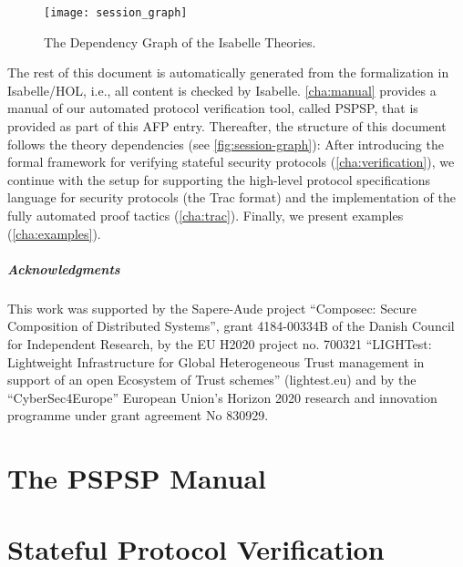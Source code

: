 \documentclass[10pt,DIV16,a4paper,abstract=true,twoside=semi,openright]
{scrreprt}
\begin{document}
  \begin{figure}
    \centering
    \texttt{[image: session\_graph]}
    \caption{The Dependency Graph of the Isabelle Theories.\label{fig:session-graph}}
  \end{figure}
  The rest of this document is automatically generated from the
  formalization in Isabelle/HOL, i.e., all content is checked by
  Isabelle. \autoref{cha:manual} provides a manual of our automated protocol verification tool, called PSPSP, that is provided as part of this AFP entry. 
Thereafter, the structure of this document follows the
  theory dependencies (see \autoref{fig:session-graph}): After
  introducing the formal framework for verifying stateful security protocols
  (\autoref{cha:verification}), we continue with the setup for
  supporting the high-level protocol specifications language for
  security protocols (the Trac format) and the implementation of the
  fully automated proof tactics (\autoref{cha:trac}). Finally, we
  present examples (\autoref{cha:examples}).

\paragraph{Acknowledgments}
This work was supported by the Sapere-Aude project ``Composec: Secure Composition of Distributed Systems'', grant 4184-00334B of the Danish Council for Independent Research, by the EU H2020 project no. 700321 ``LIGHTest: Lightweight Infrastructure for Global Heterogeneous Trust management in support of an open Ecosystem of Trust schemes'' (lightest.eu) and by the ``CyberSec4Europe'' European Union's Horizon 2020 research and innovation programme under grant agreement No 830929.

\clearpage

\chapter{The PSPSP Manual}
\label{cha:manual}




\chapter{Stateful Protocol Verification}
\label{cha:verification}






\end{document}
